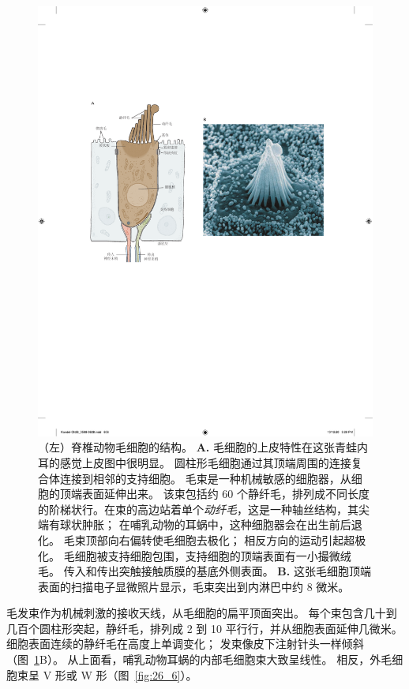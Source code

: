 \begin{figure}[htbp]
	\centering
	\includegraphics[width=1.0\linewidth]{chap26/fig_26_5}
	\caption{（左）脊椎动物毛细胞的结构。
		\textbf{A.} 毛细胞的上皮特性在这张青蛙内耳的感觉上皮图中很明显。
		圆柱形毛细胞通过其顶端周围的连接复合体连接到相邻的支持细胞。
		毛束是一种机械敏感的细胞器，从细胞的顶端表面延伸出来。
		该束包括约 60 个静纤毛，排列成不同长度的阶梯状行。在束的高边站着单个\textit{动纤毛}，这是一种轴丝结构，其尖端有球状肿胀；
		在哺乳动物的耳蜗中，这种细胞器会在出生前后退化。
		毛束顶部向右偏转使毛细胞去极化；
		相反方向的运动引起超极化。
		毛细胞被支持细胞包围，支持细胞的顶端表面有一小撮微绒毛。
		传入和传出突触接触质膜的基底外侧表面。 
		\textbf{B.} 这张毛细胞顶端表面的扫描电子显微照片显示，毛束突出到内淋巴中约 8 微米。}
	\label{fig:26_5}
\end{figure}


毛发束作为机械刺激的接收天线，从毛细胞的扁平顶面突出。
每个束包含几十到几百个圆柱形突起，静纤毛，排列成 2 到 10 平行行，并从细胞表面延伸几微米。
细胞表面连续的静纤毛在高度上单调变化；
发束像皮下注射针头一样倾斜（图~\ref{fig:26_5}B）。
从上面看，哺乳动物耳蜗的内部毛细胞束大致呈线性。 
相反，外毛细胞束呈 V 形或 W 形（图~\ref{fig:26_6}）。


